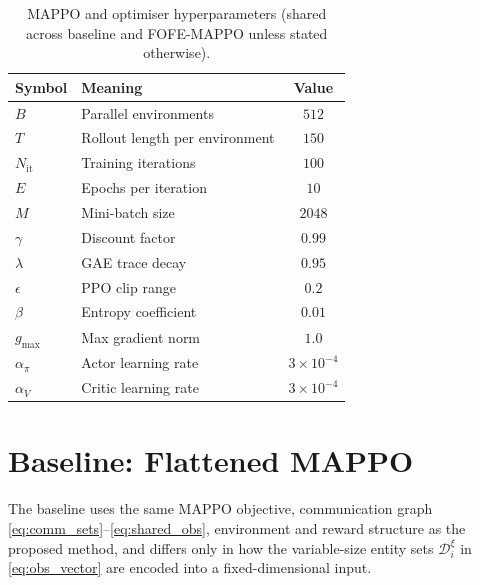 \begin{table}[H]
\centering
\caption{MAPPO and optimiser hyperparameters (shared across baseline and
FOFE-MAPPO unless stated otherwise).}
\label{tab:ppo_params}
\begin{tabular}{@{}llc@{}}
\toprule
Symbol & Meaning & Value \\ \midrule
$B$               & Parallel environments                 & $512$ \\
$T$               & Rollout length per environment        & $150$ \\
$N_{\mathrm{it}}$ & Training iterations                   & $100$ \\
$E$               & Epochs per iteration                  & $10$ \\
$M$               & Mini-batch size                       & $2048$ \\
$\gamma$          & Discount factor                       & $0.99$ \\
$\lambda$         & GAE trace decay                       & $0.95$ \\
$\epsilon$        & PPO clip range                        & $0.2$ \\
$\beta$           & Entropy coefficient                   & $0.01$ \\
$g_{\max}$        & Max gradient norm                     & $1.0$ \\
$\alpha_{\pi}$    & Actor learning rate                   & $3\times 10^{-4}$ \\
$\alpha_{V}$      & Critic learning rate                  & $3\times 10^{-4}$ \\
\bottomrule
\end{tabular}
\end{table}

\section{Baseline: Flattened MAPPO}
\label{sec:baseline}

The baseline uses the same MAPPO objective, communication graph
\eqref{eq:comm_sets}--\eqref{eq:shared_obs}, environment and reward structure
as the proposed method, and differs only in how the variable-size entity sets
$\mathcal{D}_i^{\xi}$ in \eqref{eq:obs_vector} are encoded into a
fixed-dimensional input.

